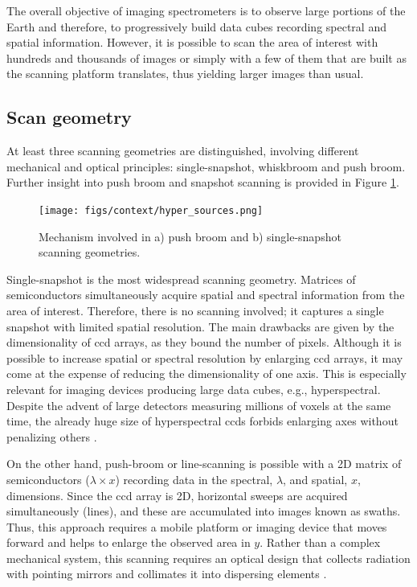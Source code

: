 The overall objective of imaging spectrometers is to observe large portions of the Earth and therefore, to progressively build data cubes recording spectral and spatial information. However, it is possible to scan the area of interest with hundreds and thousands of images or simply with a few of them that are built as the scanning platform translates, thus yielding larger images than usual. 

\subsection{Scan geometry}
\label{sec:fundamentals_optical_imaging_geometry}

At least three scanning geometries are distinguished, involving different mechanical and optical principles: single-snapshot, whiskbroom and push broom. Further insight into push broom and snapshot scanning is provided in Figure \ref{fig:hyper_scan_geometry}. 

\begin{figure}[!ht]
	\texttt{[image: figs/context/hyper\_sources.png]}
	\caption{Mechanism involved in a) push broom and b) single-snapshot scanning geometries.}
    \label{fig:hyper_scan_geometry}
\end{figure}

Single-snapshot is the most widespread scanning geometry. Matrices of semiconductors simultaneously acquire spatial and spectral information from the area of interest. Therefore, there is no scanning involved; it captures a single snapshot with limited spatial resolution. The main drawbacks are given by the dimensionality of \acrshort{ccd} arrays, as they bound the number of pixels. Although it is possible to increase spatial or spectral resolution by enlarging \acrshort{ccd} arrays, it may come at the expense of reducing the dimensionality of one axis. This is especially relevant for imaging devices producing large data cubes, e.g., hyperspectral. Despite the advent of large detectors measuring millions of voxels at the same time, the already huge size of hyperspectral \acrshort{ccd}s forbids enlarging axes without penalizing others \cite{sousa_uav-based_2022, pu_hyperspectral_2017}. 

On the other hand, push-broom or line-scanning is possible with a 2D matrix of semiconductors ($\lambda \times x$) recording data in the spectral, $\lambda$, and spatial, $x$, dimensions. Since the \acrshort{ccd} array is 2D, horizontal sweeps are acquired simultaneously (lines), and these are accumulated into images known as swaths. Thus, this approach requires a mobile platform or imaging device that moves forward and helps to enlarge the observed area in $y$. Rather than a complex mechanical system, this scanning requires an optical design that collects radiation with pointing mirrors and collimates it into dispersing elements \cite{sousa_uav-based_2022, pu_hyperspectral_2017}. 

